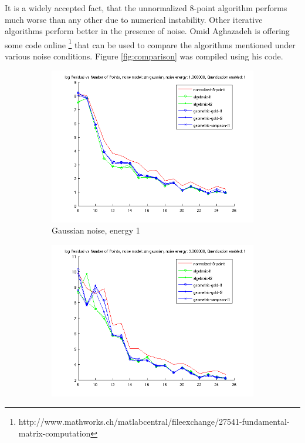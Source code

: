 \documentclass{paper}
\begin{document}
It is a widely accepted fact, that the unnormalized 8-point algorithm performs much worse
than any other due to numerical instability. Other iterative algorithms perform better in the presence of noise. Omid Aghazadeh is offering some code online
\footnote{http://www.mathworks.ch/matlabcentral/fileexchange/27541-fundamental-matrix-computation}  that can be used to 
compare the algorithms mentioned under various noise conditions. Figure \ref{fig:comparison} 
was compiled using his code.
\begin{figure}
\centering
\begin{subfigure}{0.4\textwidth}
   \includegraphics[width=\textwidth]{noise_norm1}
   \caption{Gaussian noise, energy 1}
\end{subfigure}
\begin{subfigure}{0.4\textwidth}
   \includegraphics[width=\textwidth]{noise_norm3}

\end{subfigure}
\end{figure}
\end{document}
